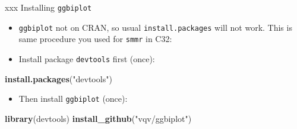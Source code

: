 \documentclass[ignorenonframetext,]{beamer}
\newenvironment{Shaded}{\begin{snugshade}}{\end{snugshade}}
\newcommand{\KeywordTok}[1]{\textcolor[rgb]{0.13,0.29,0.53}{\textbf{#1}}}
\newcommand{\NormalTok}[1]{#1}
\newcommand{\StringTok}[1]{\textcolor[rgb]{0.31,0.60,0.02}{#1}}
\providecommand{\tightlist}{%
  \setlength{\itemsep}{0pt}\setlength{\parskip}{0pt}}
\begin{document}
\begin{frame}[fragile]{xxx Installing \texttt{ggbiplot}}
\protect\hypertarget{xxx-installing-ggbiplot}{}

\begin{itemize}
\item
  \texttt{ggbiplot} not on CRAN, so usual \texttt{install.packages} will
  not work. This is same procedure you used for \texttt{smmr} in C32:
\item
  Install package \texttt{devtools} first (once):
\end{itemize}

\begin{Shaded}
\begin{Highlighting}[]
\KeywordTok{install.packages}\NormalTok{(}\StringTok{"devtools"}\NormalTok{)}
\end{Highlighting}
\end{Shaded}

\begin{itemize}
\tightlist
\item
  Then install \texttt{ggbiplot} (once):
\end{itemize}

\begin{Shaded}
\begin{Highlighting}[]
\KeywordTok{library}\NormalTok{(devtools)}
\KeywordTok{install_github}\NormalTok{(}\StringTok{"vqv/ggbiplot"}\NormalTok{)}
\end{Highlighting}
\end{Shaded}

\end{frame}
\end{document}
